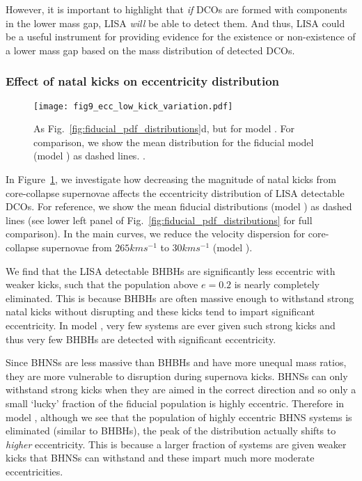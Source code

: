 However, it is important to highlight that \textit{if} DCOs are formed with components in the lower mass gap, LISA \textit{will} be able to detect them. And thus, LISA could be a useful instrument for providing evidence for the existence or non-existence of a lower mass gap based on the mass distribution of detected DCOs.

\subsubsection{Effect of natal kicks on eccentricity distribution}

\begin{figure}[tb]
    \centering
    \texttt{[image: fig9\_ecc\_low\_kick\_variation.pdf]}
    \caption{As Fig.~\ref{fig:fiducial_pdf_distributions}d, but for model \modSigLower{}. For comparison, we show the mean distribution for the fiducial model (model \modFid{}) as dashed lines. \href{https://github.com/TomWagg/detecting-DCOs-in-LISA/blob/main/paper/figures/fig9_ecc_low_kick_variation.pdf}{\faFileImage} \href{https://github.com/TomWagg/detecting-DCOs-in-LISA/blob/main/paper/figure_notebooks/variations.ipynb}{\faBook}.}
    \label{fig:ecc_low_kick_variation}
\end{figure}

In Figure~\ref{fig:ecc_low_kick_variation}, we investigate how decreasing the magnitude of natal kicks from core-collapse supernovae affects the eccentricity distribution of LISA detectable DCOs. For reference, we show the mean fiducial distributions (model \modFid{}) as dashed lines (see lower left panel of Fig.~\ref{fig:fiducial_pdf_distributions} for full comparison). In the main curves, we reduce the velocity dispersion for core-collapse supernovae from $265 \unit{km}{s^{-1}}$ to $30 \unit{km}{s^{-1}}$ (model \modSigLower{}).

We find that the LISA detectable BHBHs are significantly less eccentric with weaker kicks, such that the population above $e = 0.2$ is nearly completely eliminated. This is because BHBHs are often massive enough to withstand strong natal kicks without disrupting and these kicks tend to impart significant eccentricity. In model \modSigLower{}, very few systems are ever given such strong kicks and thus very few BHBHs are detected with significant eccentricity.

Since BHNSs are less massive than BHBHs and have more unequal mass ratios, they are more vulnerable to disruption during supernova kicks. BHNSs can only withstand strong kicks when they are aimed in the correct direction and so only a small `lucky' fraction of the fiducial population is highly eccentric. Therefore in model \modSigLower{}, although we see that the population of highly eccentric BHNS systems is eliminated (similar to BHBHs), the peak of the distribution actually shifts to \textit{higher} eccentricity. This is because a larger fraction of systems are given weaker kicks that BHNSs can withstand and these impart much more moderate eccentricities.

